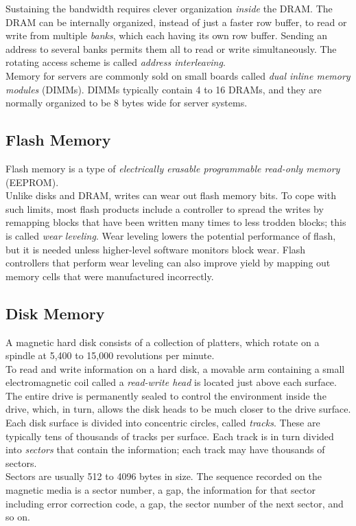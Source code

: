 \documentclass[12pt]{article}
\theoremstyle{definition}
\begin{document}
  Sustaining the bandwidth requires clever organization \emph{inside} the DRAM.
  The DRAM can be internally organized, instead of just a faster row buffer, to read or write from multiple \emph{banks}, which each having its own row buffer.
  Sending an address to several banks permits them all to read or write simultaneously.
  The rotating access scheme is called \emph{address interleaving}. \\

  Memory for servers are commonly sold on small boards called \emph{dual inline memory modules} (DIMMs).
  DIMMs typically contain 4 to 16 DRAMs, and they are normally organized to be 8 bytes wide for server systems.

  \subsection{Flash Memory}
  Flash memory is a type of \emph{electrically erasable programmable read-only memory} (EEPROM). \\
  Unlike disks and DRAM, writes can wear out flash memory bits.
  To cope with such limits, most flash products include a controller to spread the writes by remapping blocks that have been written many times to less trodden blocks;
  this is called \emph{wear leveling}.
  Wear leveling lowers the potential performance of flash, but it is needed unless higher-level software monitors block wear.
  Flash controllers that perform wear leveling can also improve yield by mapping out memory cells that were manufactured incorrectly.

  \subsection{Disk Memory}
  A magnetic hard disk consists of a collection of platters, which rotate on a spindle at 5,400 to 15,000 revolutions per minute. \\
  To read and write information on a hard disk, a movable arm containing a small electromagnetic coil called a \emph{read-write head} is located just above each surface.
  The entire drive is permanently sealed to control the environment inside the drive, which, in turn, allows the disk heads to be much closer to the drive surface. \\

  Each disk surface is divided into concentric circles, called \emph{tracks}.
  These are typically tens of thousands of tracks per surface.
  Each track is in turn divided into \emph{sectors} that contain the information; each track may have thousands of sectors. \\
  Sectors are usually 512 to 4096 bytes in size.
  The sequence recorded on the magnetic media is a sector number, a gap, the information for that sector including error correction code, a gap, the sector number of the next sector, and so on. \\
\end{document}

